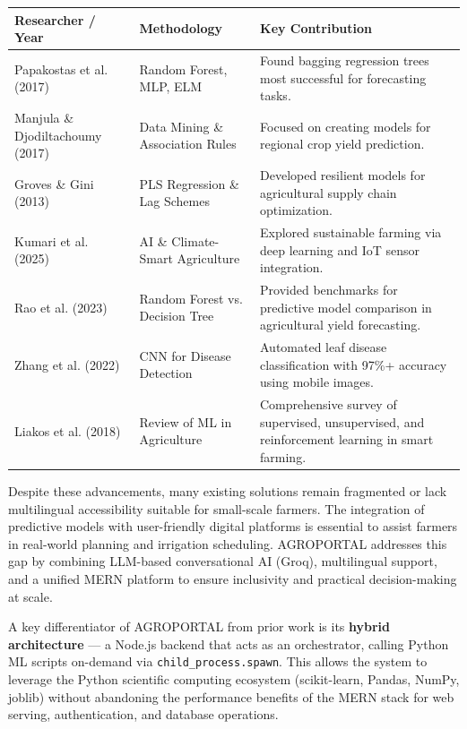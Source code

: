 \documentclass[12pt,a4paper]{report}
\begin{document}
\begin{table}[h!]
\centering
\begin{tabular}{|l|l|l|}
\hline
Researcher / Year & Methodology & Key Contribution \\ \hline
Papakostas et al. (2017) & Random Forest, MLP, ELM & Found bagging regression trees most successful for forecasting tasks. \\ \hline
Manjula \& Djodiltachoumy (2017) & Data Mining \& Association Rules & Focused on creating models for regional crop yield prediction. \\ \hline
Groves \& Gini (2013) & PLS Regression \& Lag Schemes & Developed resilient models for agricultural supply chain optimization. \\ \hline
Kumari et al. (2025) & AI \& Climate-Smart Agriculture & Explored sustainable farming via deep learning and IoT sensor integration. \\ \hline
Rao et al. (2023) & Random Forest vs. Decision Tree & Provided benchmarks for predictive model comparison in agricultural yield forecasting. \\ \hline
Zhang et al. (2022) & CNN for Disease Detection & Automated leaf disease classification with 97\%+ accuracy using mobile images. \\ \hline
Liakos et al. (2018) & Review of ML in Agriculture & Comprehensive survey of supervised, unsupervised, and reinforcement learning in smart farming. \\ \hline
\end{tabular}
\end{table}

Despite these advancements, many existing solutions remain fragmented or lack multilingual accessibility suitable for small-scale farmers. The integration of predictive models with user-friendly digital platforms is essential to assist farmers in real-world planning and irrigation scheduling. AGROPORTAL addresses this gap by combining LLM-based conversational AI (Groq), multilingual support, and a unified MERN platform to ensure inclusivity and practical decision-making at scale.

A key differentiator of AGROPORTAL from prior work is its \textbf{hybrid architecture} — a Node.js backend that acts as an orchestrator, calling Python ML scripts on-demand via \texttt{child\_process.spawn}. This allows the system to leverage the Python scientific computing ecosystem (scikit-learn, Pandas, NumPy, joblib) without abandoning the performance benefits of the MERN stack for web serving, authentication, and database operations.
\end{document}
